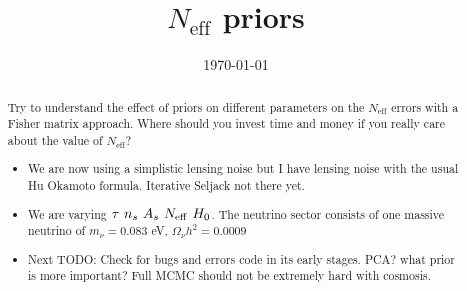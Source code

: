 \documentclass[aps,prl,preprint,groupedaddress]{revtex4-1}
\begin{document}
\graphicspath{{../images/}}


\title{$N_{\text{eff}}$ priors}


\author{}
\affiliation{}


\date{\today}

\begin{abstract}
Try to understand the effect of priors on different parameters on the $N_{\text{eff}}$ errors with a Fisher matrix approach. Where should you invest time and money if you really care about the value of $N_{\text{eff}}$?

\begin{itemize}
\item We are now using a simplistic lensing noise but I have lensing noise with the usual Hu Okamoto formula. Iterative Seljack not there yet.
\item We are varying $\tau ~ n_{s} ~ A_{s} ~ N_{\rm eff} ~ H_{0}$. The neutrino sector consists of one massive neutrino of $m_{\nu}=0.083$ eV, $\Omega_{\nu}h^{2}=0.0009$
\item Next TODO: Check for bugs and errors code in its early stages. PCA? what prior is more important? Full MCMC should not be extremely hard with cosmosis.
\end{itemize}


\end{abstract}
\end{document}
